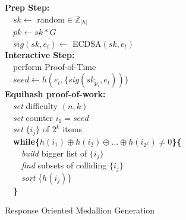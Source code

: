 \begin{algorithm}[H]

  
  \textbf{Prep Step:}\\
    ~~$sk\gets$ random$\in \mathbb{Z}_{|h|}$\\
    ~~$pk\gets sk*G$\\
    ~~$sig(sk,e_t)\gets$ ECDSA$(sk,e_t)$\\
   \textbf{Interactive Step:}\\
    ~~perform Proof-of-Time\\%
    ~~$seed\gets h(e_t, \{sig(sk_{p_i},e_t))\}$ \\
  \textbf{Equihash proof-of-work:}\\
    ~~\textit{set} difficulty $(n,k)$\\
    ~~\textit{set} counter $i_1 = seed$\\
    ~~\textit{set} $\{i_j\}$ of $2^k$ items\\
    ~~\textbf{while\{}$h(i_1) \oplus h(i_2) \oplus ...\oplus h(i_{2^k}) \neq 0$\textbf{\}\{}\\
     ~~~~\textit{build} bigger list of $\{i_j\}$\\
     ~~~~\textit{find} subsets of colliding $\{i_j\}$\\
     ~~~~\textit{sort} \{$h(i_j)$\}\\
    ~~\textbf{\}}\\
    
   \caption{Response Oriented Medallion Generation}
\end{algorithm}

%

\clearpage
